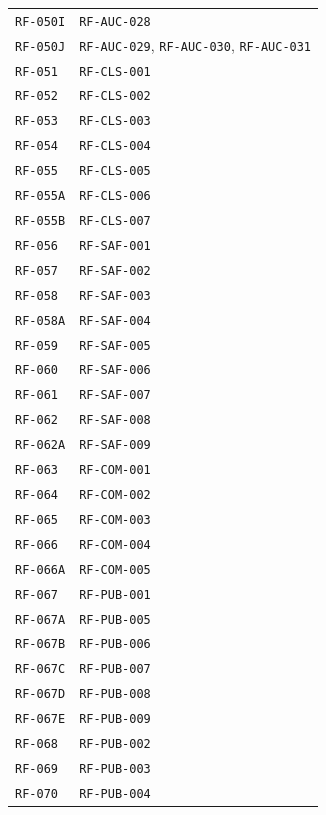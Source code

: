 \documentclass[10pt,letterpaper]{article}
\begin{document}
\begin{longtable}{P{3.0cm}P{10.6cm}}
\texttt{RF-050I} & \texttt{RF-AUC-028}\\
\texttt{RF-050J} & \texttt{RF-AUC-029}, \texttt{RF-AUC-030}, \texttt{RF-AUC-031}\\
\texttt{RF-051} & \texttt{RF-CLS-001}\\
\texttt{RF-052} & \texttt{RF-CLS-002}\\
\texttt{RF-053} & \texttt{RF-CLS-003}\\
\texttt{RF-054} & \texttt{RF-CLS-004}\\
\texttt{RF-055} & \texttt{RF-CLS-005}\\
\texttt{RF-055A} & \texttt{RF-CLS-006}\\
\texttt{RF-055B} & \texttt{RF-CLS-007}\\
\texttt{RF-056} & \texttt{RF-SAF-001}\\
\texttt{RF-057} & \texttt{RF-SAF-002}\\
\texttt{RF-058} & \texttt{RF-SAF-003}\\
\texttt{RF-058A} & \texttt{RF-SAF-004}\\
\texttt{RF-059} & \texttt{RF-SAF-005}\\
\texttt{RF-060} & \texttt{RF-SAF-006}\\
\texttt{RF-061} & \texttt{RF-SAF-007}\\
\texttt{RF-062} & \texttt{RF-SAF-008}\\
\texttt{RF-062A} & \texttt{RF-SAF-009}\\
\texttt{RF-063} & \texttt{RF-COM-001}\\
\texttt{RF-064} & \texttt{RF-COM-002}\\
\texttt{RF-065} & \texttt{RF-COM-003}\\
\texttt{RF-066} & \texttt{RF-COM-004}\\
\texttt{RF-066A} & \texttt{RF-COM-005}\\
\texttt{RF-067} & \texttt{RF-PUB-001}\\
\texttt{RF-067A} & \texttt{RF-PUB-005}\\
\texttt{RF-067B} & \texttt{RF-PUB-006}\\
\texttt{RF-067C} & \texttt{RF-PUB-007}\\
\texttt{RF-067D} & \texttt{RF-PUB-008}\\
\texttt{RF-067E} & \texttt{RF-PUB-009}\\
\texttt{RF-068} & \texttt{RF-PUB-002}\\
\texttt{RF-069} & \texttt{RF-PUB-003}\\
\texttt{RF-070} & \texttt{RF-PUB-004}\\

\end{longtable}
\end{document}
